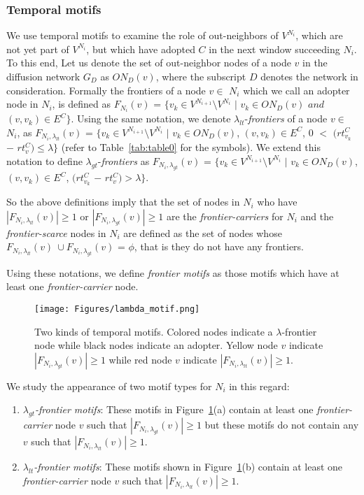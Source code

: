 \documentclass[smallextended]{svjour3}       %
\theoremstyle{definition}
\begin{document}
\subsubsection{Temporal motifs}\label{sec:temporal_motifs}
 We use temporal motifs to examine the role of out-neighbors of $V^{N_i}$, which are not yet part of $V^{N_i}$, but which have adopted $C$ in the next window succeeding $N_i$. To this end, Let us denote the set of out-neighbor nodes of a node $v$ in the diffusion network $G_D$ as $ON_D(v)$, where the subscript $D$ denotes the network in consideration. Formally the frontiers of a node $v \in$ $N_i$ which we call an adopter node in $N_i$,  is defined as $F_{N_i}(v)$ = $\{ v_k \in V^{N_{i+1}} \setminus V^{N_i}$ $ | $  $v_k \in ON_D(v) $  $and$ $(v, v_k) \in E^{C} \}$. Using the same notation, we denote $\lambda_{lt}$-\textit{frontiers} \cite{guo_cascade} of a node $v \in$ $N_i$, as $F_{N_i, \lambda_{lt}}(v)$ = $\{ v_k \in V^{N_{i+1}} \setminus V^{N_i}$ $ | $  $v_k \in ON_D(v) $, $(v, v_k) \in E^{C}$, $0$ $<$ $(rt_{v_k}^C$ $-$ $rt_{v}^C) \leq \lambda  \}$ (refer to Table~\ref{tab:table0} for the symbols). We extend this notation to define $\lambda_{gt}$-\textit{frontiers} as $F_{N_i, \lambda_{gt}}(v)$ = $\{ v_k \in V^{N_{i+1}} \setminus V^{N_i}$ $ | $  $v_k \in ON_D(v) $, $(v, v_k) \in E^{C}$, $(rt_{v_k}^C$ $-$ $rt_{v}^C) > \lambda  \}$. 
 
 So the above definitions imply that the set of nodes in $N_i$ who have $|F_{N_i, \lambda_{lt}}(v)| \geq 1$ or $|F_{N_i, \lambda_{gt}}(v)| \geq 1$ are the \textit{frontier-carriers} for $N_i$ and the \textit{frontier-scarce} nodes in $N_i$ are defined as the set of nodes whose $F_{N_i, \lambda_{lt}}(v) \ \cup F_{N_i, \lambda_{gt}}(v)$ = $\phi$, that is they do not have any frontiers.
 
 Using these notations, we define \textit{frontier motifs} as those motifs which have at least one \textit{frontier-carrier} node. 
 
 \begin{figure}[!h]
 	\centering
 	\texttt{[image: Figures/lambda\_motif.png]}
 	\caption{Two kinds of temporal motifs. Colored nodes indicate a $\lambda$-frontier node while black nodes indicate an adopter. Yellow node $v$ indicate  $|F_{N_i, \lambda_{gt}}(v)| \geq 1 $  while red node $v$ indicate $ |F_{N_i, \lambda_{lt}}(v)| \geq 1 $. }
 	\label{fig:lambda_motif}
 \end{figure}

We study the appearance of two motif types for $N_i$ in this regard:
\begin{enumerate}
	\item \textit{$\lambda_{gt}$-frontier motifs}: These motifs in Figure~\ref{fig:lambda_motif}(a) contain at least one \textit{frontier-carrier} node $v$ such that $ |F_{N_i, \lambda_{gt}}(v)| \geq 1 $ but these motifs do not contain any $v$ such that $ |F_{N_i, \lambda_{lt}}(v)| \geq 1 $.
	
	\item \textit{$\lambda_{lt}$-frontier motifs}: These motifs shown in Figure~\ref{fig:lambda_motif}(b) contain at least one \textit{frontier-carrier} node $v$ such that $ |F_{N_i, \lambda_{lt}}(v)| \geq 1 $.
\end{enumerate}
\end{document}
